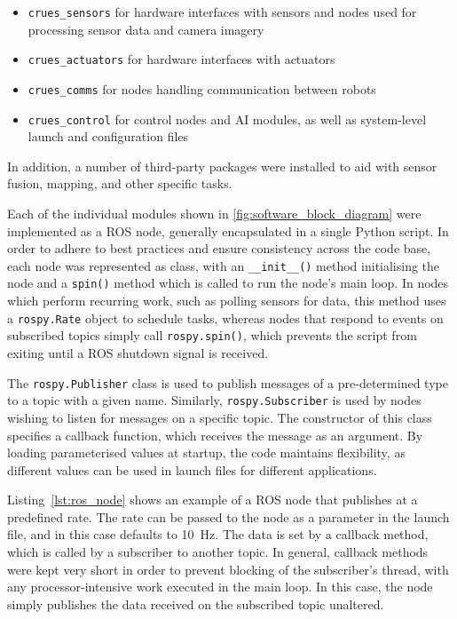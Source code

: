 \begin{itemize}
	\item \verb|crues_sensors| for hardware interfaces with sensors and nodes used
	for processing sensor data and camera imagery
	\item \verb|crues_actuators| for hardware interfaces with actuators
	\item \verb|crues_comms| for nodes handling communication between robots
	\item \verb|crues_control| for control nodes and AI modules, as well as
	system-level launch and configuration files
\end{itemize}

In addition, a number of third-party packages were installed to aid with
sensor fusion, mapping, and other specific tasks.

Each of the individual modules shown in \ref{fig:software_block_diagram} were
implemented as a ROS node, generally encapsulated in a single Python
script. In order to adhere to best practices and ensure consistency across
the code base, each node was represented as class, with an
\verb|__init__()| method initialising the node and a \verb|spin()| method
which is called to run the node's main loop. In nodes which perform
recurring work, such as polling sensors for data, this method uses a
\verb|rospy.Rate| object to schedule tasks, whereas nodes that respond to
events on subscribed topics simply call \verb|rospy.spin()|, which
prevents the script from exiting until a ROS shutdown signal is received.

The \verb|rospy.Publisher| class is used to publish messages of a
pre-determined type to a topic with a given name. Similarly,
\verb|rospy.Subscriber| is used by nodes wishing to listen for messages on
a specific topic. The constructor of this class specifies a callback
function, which receives the message as an argument. By loading parameterised
values at startup, the code maintains flexibility, as different values can
be used in launch files for different applications.

Listing~\ref{lst:ros_node} shows an example of a ROS node that publishes
at a predefined rate. The rate can be passed to the node as a parameter in
the launch file, and in this case defaults to \SI{10}{\Hz}. The data is
set by a callback method, which is called by a subscriber to another
topic. In general, callback methods were kept very short in order to
prevent blocking of the subscriber's thread, with any processor-intensive
work executed in the main loop. In this case, the node simply publishes the
data received on the subscribed topic unaltered.


